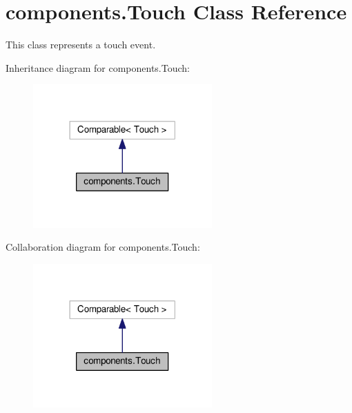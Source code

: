 \hypertarget{classcomponents_1_1_touch}{}\section{components.\+Touch Class Reference}
\label{classcomponents_1_1_touch}


This class represents a touch event.  




Inheritance diagram for components.\+Touch\+:\nopagebreak
\begin{figure}[H]
\begin{center}
\leavevmode
\includegraphics[width=194pt]{classcomponents_1_1_touch__inherit__graph}
\end{center}
\end{figure}


Collaboration diagram for components.\+Touch\+:\nopagebreak
\begin{figure}[H]
\begin{center}
\leavevmode
\includegraphics[width=194pt]{classcomponents_1_1_touch__coll__graph}
\end{center}
\end{figure}
